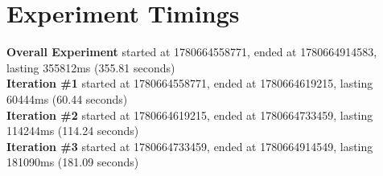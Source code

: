 \documentclass{article}
\begin{document}
\section*{Experiment Timings}
\textbf{Overall Experiment} started at 1780664558771, ended at 1780664914583, lasting 355812ms (355.81 seconds)
\\\textbf{Iteration \#1} started at 1780664558771, ended at 1780664619215, lasting 60444ms (60.44 seconds)
\\\textbf{Iteration \#2} started at 1780664619215, ended at 1780664733459, lasting 114244ms (114.24 seconds)
\\\textbf{Iteration \#3} started at 1780664733459, ended at 1780664914549, lasting 181090ms (181.09 seconds)
\end{document}
